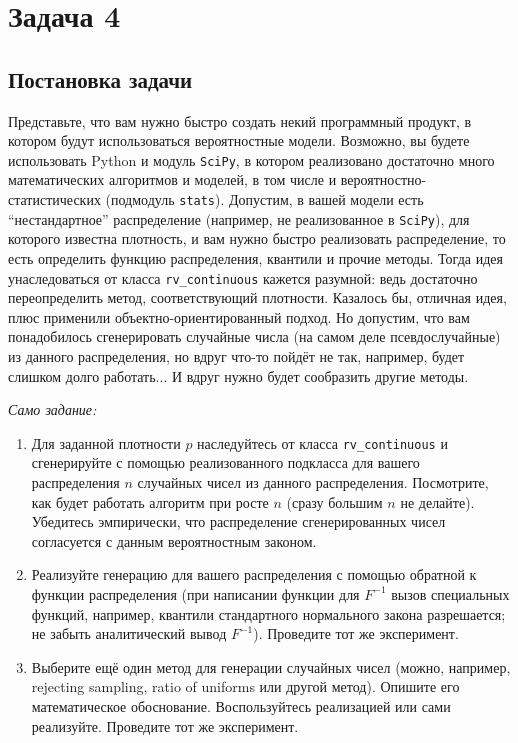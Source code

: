 \documentclass[a4paper,14pt]{extarticle}
\begin{document}
    
    \section*{Задача 4}
        
        \subsection*{Постановка задачи}
            
            Представьте, что вам нужно быстро создать некий программный продукт, в котором будут использоваться вероятностные модели. Возможно, вы будете использовать Python и модуль \texttt{SciPy}, в котором реализовано достаточно много математических алгоритмов и моделей, в том числе и вероятностно-статистических (подмодуль \texttt{stats}). Допустим, в вашей модели есть ``нестандартное'' распределение (например, не реализованное в \texttt{SciPy}), для которого известна плотность, и вам нужно быстро реализовать распределение, то есть определить функцию распределения, квантили и прочие методы. Тогда идея унаследоваться от класса \texttt{rv\_continuous} кажется разумной: ведь достаточно переопределить метод, соответствующий плотности. Казалось бы, отличная идея, плюс применили объектно-ориентированный подход. Но допустим, что вам понадобилось сгенерировать случайные числа (на самом деле псевдослучайные) из данного распределения, но вдруг что-то пойдёт не так, например, будет слишком долго работать... И вдруг нужно будет сообразить другие методы.
            
            \textit{Само задание:}
            \begin{enumerate}
                \item Для заданной плотности $p$ наследуйтесь от класса \texttt{rv\_continuous} и сгенерируйте с помощью реализованного подкласса для вашего распределения $n$ случайных чисел из данного распределения. Посмотрите, как будет работать алгоритм при росте $n$ (сразу большим $n$ не делайте). Убедитесь эмпирически, что распределение сгенерированных чисел согласуется с данным вероятностным законом.
                \item Реализуйте генерацию для вашего распределения с помощью обратной к функции распределения (при написании функции для $F^{-1}$ вызов специальных функций, например, квантили стандартного нормального закона разрешается; не забыть аналитический вывод $F^{-1}$). Проведите тот же эксперимент.
                \item Выберите ещё один метод для генерации случайных чисел (можно, например, rejecting sampling, ratio of uniforms или другой метод). Опишите его математическое обоснование. Воспользуйтесь реализацией или сами реализуйте. Проведите тот же эксперимент.
            \end{enumerate}
        
\end{document}
